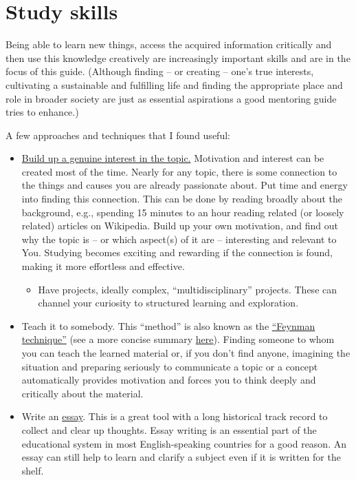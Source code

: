 \documentclass{article}
\begin{document}
\section{Study skills}

Being able to learn new things, access the acquired information critically and then use this knowledge creatively are increasingly important skills and are in the focus of this guide. (Although finding -- or creating -- one's true interests, cultivating a sustainable and fulfilling life and finding the appropriate place and role in broader society are just as essential aspirations a good mentoring guide tries to enhance.)

A few approaches and techniques that I found useful:

\begin{itemize}
    \item \underline{Build up a genuine interest in the topic.} Motivation and interest can be created most of the time. Nearly for any topic, there is some connection to the things and causes you are already passionate about. Put time and energy into finding this connection. This can be done by reading broadly about the background, e.g., spending 15 minutes to an hour reading related (or loosely related) articles on Wikipedia. Build up your own motivation, and find out why the topic is -- or which aspect(s) of it are -- interesting and relevant to You.
    Studying becomes exciting and rewarding if the connection is found, making it more effortless and effective.
    \begin{itemize}
        \item Have projects, ideally complex, ``multidisciplinary'' projects. These can channel your curiosity to structured learning and exploration.
    \end{itemize}
    \item Teach it to somebody. This ``method'' is also known as the \href{https://todoist.com/inspiration/feynman-technique}{``Feynman technique''} (see a more concise summary \href{https://subjectguides.york.ac.uk/study-revision/feynman-technique}{here}). Finding someone to whom you can teach the learned material or, if you don't find anyone, imagining the situation and preparing seriously to communicate a topic or a concept automatically provides motivation and forces you to think deeply and critically about the material.  
    \item Write an \href{https://www.youtube.com/watch?v=lML0ndFlBuc}{essay}. This is a great tool with a long historical track record to collect and clear up thoughts. Essay writing is an essential part of the educational system in most English-speaking countries for a good reason. An essay can still help to learn and clarify a subject even if it is written for the shelf. 

\end{itemize}
\end{document}
